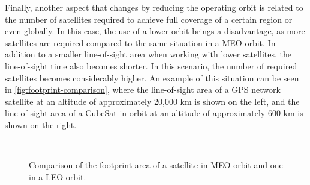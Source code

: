 Finally, another aspect that changes by reducing the operating orbit is related to the number of satellites required to achieve full coverage of a certain region or even globally. In this case, the use of a lower orbit brings a disadvantage, as more satellites are required compared to the same situation in a MEO orbit. In addition to a smaller line-of-sight area when working with lower satellites, the line-of-sight time also becomes shorter. In this scenario, the number of required satellites becomes considerably higher. An example of this situation can be seen in \autoref{fig:footprint-comparison}, where the line-of-sight area of a GPS network satellite at an altitude of approximately 20,000 km is shown on the left, and the line-of-sight area of a CubeSat in orbit at an altitude of approximately 600 km is shown on the right.

\begin{figure}[!htb]
    \begin{center}
        ~
        \caption{Comparison of the footprint area of a satellite in MEO orbit and one in a LEO orbit.}
        \label{fig:footprint-comparison}
    \end{center}
\end{figure}

